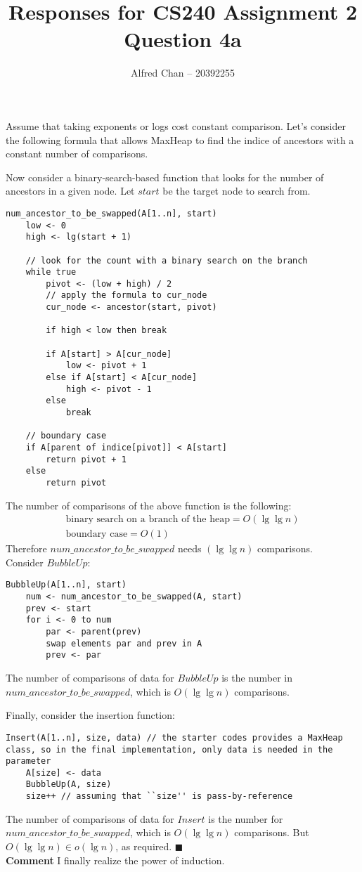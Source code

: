 \documentclass[12pt]{article}
\title{Responses for CS240 Assignment 2 Question 4a}
\author{Alfred Chan -- 20392255}
\begin{document}
\maketitle

Assume that taking exponents or logs cost constant comparison.
Let's consider the following formula that allows MaxHeap to find the indice of ancestors with a constant number of comparisons.

Now consider a binary-search-based function that looks for the number of ancestors in a given node. Let $start$ be the target node to search from.
\begin{lstlisting}
num_ancestor_to_be_swapped(A[1..n], start)
	low <- 0
	high <- lg(start + 1)

	// look for the count with a binary search on the branch
	while true
		pivot <- (low + high) / 2
		// apply the formula to cur_node
		cur_node <- ancestor(start, pivot)

		if high < low then break

		if A[start] > A[cur_node]
			low <- pivot + 1
		else if A[start] < A[cur_node]
			high <- pivot - 1
		else
			break

	// boundary case
	if A[parent of indice[pivot]] < A[start]
		return pivot + 1
	else
		return pivot
\end{lstlisting}
The number of comparisons of the above function is the following:
\begin{align*}
\text{binary search on a branch of the heap} = O(\lg\lg n)\\
\text{boundary case} = O(1)
\end{align*}
Therefore $num\_ancestor\_to\_be\_swapped$ needs $(\lg\lg n)$ comparisons.\\
Consider $BubbleUp$:
\begin{lstlisting}
BubbleUp(A[1..n], start)
	num <- num_ancestor_to_be_swapped(A, start)
	prev <- start
	for i <- 0 to num
		par <- parent(prev)
		swap elements par and prev in A
		prev <- par
\end{lstlisting}
The number of comparisons of data for $BubbleUp$ is the number in $num\_ancestor\_to\_be\_swapped$, which is $O(\lg\lg n)$ comparisons.

Finally, consider the insertion function:
\begin{lstlisting}
Insert(A[1..n], size, data) // the starter codes provides a MaxHeap class, so in the final implementation, only data is needed in the parameter
	A[size] <- data
	BubbleUp(A, size)
	size++ // assuming that ``size'' is pass-by-reference
\end{lstlisting}
The number of comparisons of data for $Insert$ is the number for $num\_ancestor\_to\_be\_swapped$, which is $O(\lg\lg n)$ comparisons.
But $O(\lg\lg n) \in o(\lg n)$, as required.
\hfill $\blacksquare$\\
{\bf Comment} I finally realize the power of induction.
\end{document}
